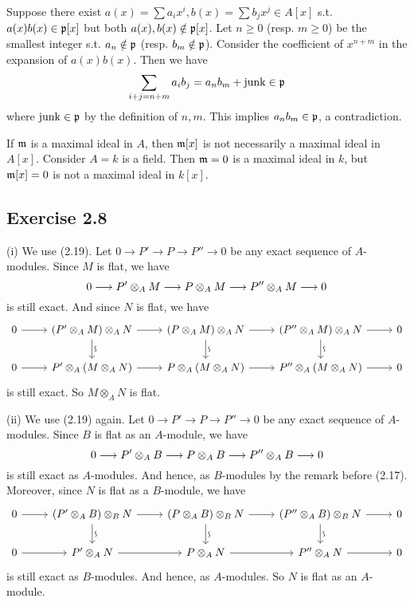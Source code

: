 \documentclass[../A&M.tex]{subfiles}
\begin{document}
Suppose there exist $a(x) = \sum a_ix^i, b(x) = \sum b_jx^j \in A[x]$ s.t. $a(x)b(x) \in \mathfrak{p}[x]$ but both $a(x),b(x) \notin \mathfrak{p}[x]$. Let $n\geq0$ (resp. $m\geq0$) be the smallest integer s.t. $a_n \notin \mathfrak{p}$ (resp. $b_m \notin \mathfrak{p}$). Consider the coefficient of $x^{n+m}$ in the expansion of $a(x)b(x)$. Then we have
$$
\sum_{i+j = n+m} a_ib_j = a_nb_m + \operatorname{junk} \in \mathfrak{p}
$$
where $\operatorname{junk} \in \mathfrak{p}$ by the definition of $n,m$. This implies $a_nb_m \in \mathfrak{p}$, a contradiction.

If $\mathfrak{m}$ is a maximal ideal in $A$, then $\mathfrak{m}[x]$ is not necessarily a maximal ideal in $A[x]$. Consider $A=k$ is a field. Then $\mathfrak{m} = 0$ is a maximal ideal in $k$, but $\mathfrak{m}[x] = 0$ is not a maximal ideal in $k[x]$.

\subsection*{Exercise 2.8}

(i) We use (2.19). Let $0 \to P' \to P \to P'' \to 0$ be any exact sequence of $A$-modules. Since $M$ is flat, we have
$$
0 \longrightarrow P' \otimes_A M \longrightarrow P \otimes_A M \longrightarrow P'' \otimes_A M \longrightarrow 0
$$
is still exact. And since $N$ is flat, we have
$$
\begin{tikzcd}
0 \arrow{r} & (P' \otimes_A M) \otimes_A N \arrow{r} \isoarrow{d} &  (P \otimes_A M) \otimes_A N \arrow{r} \isoarrow{d} &  (P'' \otimes_A M) \otimes_A N \arrow{r} \isoarrow{d} & 0 \\ 
0 \arrow{r} & P' \otimes_A (M \otimes_A N) \arrow{r} & P \otimes_A (M \otimes_A N) \arrow{r} & P'' \otimes_A (M \otimes_A N) \arrow[r] & 0
\end{tikzcd}
$$
is still exact. So $M \otimes_A N$ is flat.

(ii) We use (2.19) again. Let $0 \to P' \to P \to P'' \to 0$ be any exact sequence of $A$-modules. Since $B$ is flat as an $A$-module, we have
$$
0 \longrightarrow P' \otimes_A B \longrightarrow P \otimes_A B \longrightarrow P'' \otimes_A B \longrightarrow 0
$$
is still exact as $A$-modules. And hence, as $B$-modules by the remark before (2.17). Moreover, since $N$ is flat as a $B$-module, we have
$$
\begin{tikzcd}
0 \arrow{r} & (P' \otimes_A B) \otimes_B N \arrow{r} \isoarrow{d} &  (P \otimes_A B) \otimes_B N \arrow{r} \isoarrow{d} &  (P'' \otimes_A B) \otimes_B N \arrow{r} \isoarrow{d} & 0 \\ 
0 \arrow{r} & P' \otimes_A N \arrow{r} & P \otimes_A N \arrow{r} & P'' \otimes_A N \arrow[r] & 0
\end{tikzcd}
$$
is still exact as $B$-modules. And hence, as $A$-modules. So $N$ is flat as an $A$-module.
\end{document}
